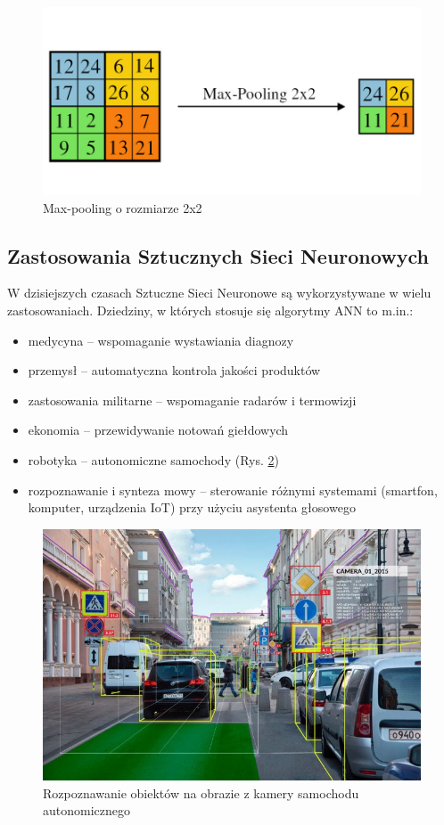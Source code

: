 \begin{figure}[!h]
  \centering
  \includegraphics[width=\textwidth]{img/pooling.jpg}
  \caption{Max-pooling o rozmiarze 2x2}
  \label{pooling}
\end{figure}

\subsection{Zastosowania Sztucznych Sieci Neuronowych}

W dzisiejszych czasach Sztuczne Sieci Neuronowe są wykorzystywane w wielu zastosowaniach. Dziedziny, w których stosuje się algorytmy ANN to m.in.:
\begin{itemize}
  \item medycyna -- wspomaganie wystawiania diagnozy
  \item przemysł -- automatyczna kontrola jakości produktów
  \item zastosowania militarne -- wspomaganie radarów i termowizji
  \item ekonomia -- przewidywanie notowań giełdowych
  \item robotyka -- autonomiczne samochody (Rys. \ref{self-driving-car})
  \item rozpoznawanie i synteza mowy -- sterowanie różnymi systemami (smartfon, komputer, urządzenia IoT) przy użyciu asystenta głosowego
\end{itemize}

\begin{figure}[!h]
  \centering
  \includegraphics[width=\textwidth]{img/self-driving-car.jpg}
  \caption{Rozpoznawanie obiektów na obrazie z kamery samochodu autonomicznego \cite{self-drive-obraz}}
  \label{self-driving-car}
\end{figure}


